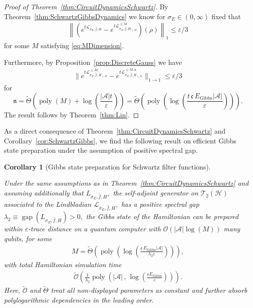 \documentclass[11pt]{amsart}
\newcommand{\1}{\mathbbm{1}}
\newcommand{\cH}{\mathcal{H}}
\newcommand{\cL}{\mathcal{L}}
\newcommand{\eps}{\varepsilon}
\renewcommand{\epsilon}{\varepsilon}
\newcommand{\cA}{\mathcal{A}}
\theoremstyle{plain}
\newtheorem{corollary}[theorem]{Corollary}
\theoremstyle{definition}
\theoremstyle{remark}
\numberwithin{equation}{section}
\begin{document}
\begin{proof}[Proof of Theorem~\ref{thm:CircuitDynamicsSchwartz}]
By Theorem~\ref{thm:SchwartzGibbsDynamics} we know for $\sigma_E\in(0,\infty)$ fixed that
\begin{align*}
\left\|\left(e^{t\mathcal{L}_{\sigma_E,\widehat{f},H}}-e^{t\mathcal{L}^{\le M}_{\sigma_E,\widehat{f},H_{\le M}}}\right)(\rho)\right\|_1  \le \eps/3 
\end{align*}
for some $M$ satisfying \eqref{eq:MDimension}. 

Furthermore, by Proposition~\ref{prop:DiscreteGauss} we have 
\begin{align*}
\Big\|e^{t\mathcal{L}^{\le M}_{\sigma_E,\widehat{f},H_{\le M}}}-e^{t\mathcal{L}^{\le M,\mathfrak{n}}_{\sigma_E,\widehat{f},H_{\le M}}}\Big\|_{1\to 1}\le \epsilon/3
\end{align*}
for  $$\mathfrak{n} = \widetilde\Theta\left(\operatorname{poly}(M)+ \log\left(\frac{|\cA|t}{\eps}\right) \right) =\widetilde \Theta\left( \operatorname{poly}\left(\log\left(\frac{t\,\mathfrak{c}\,E_{\operatorname{Gibbs}}|\cA|}{\eps}\right)\right)\right).$$ The result follows by Theorem~\ref{thm:Lin}.

\end{proof}
As a direct consequence of Theorem~\ref{thm:CircuitDynamicsSchwartz} and Corollary~\ref{cor:SchwartzGibbs}, we find the following result on efficient Gibbs state preparation under the assumption of positive spectral gap.
\begin{corollary} [Gibbs state preparation for Schwartz filter functions]
\label{cor:GibbsCircuitSchwartz}

Under the same assumptions as in Theorem~\ref{thm:CircuitDynamicsSchwartz} and assuming additionally that  $L_{\sigma_E,\widehat{f},H},$ the self-adjoint generator on $\mathscr{T}_2(\cH)$ associated to the Lindbladian $\cL_{\sigma_E,\widehat f,H},$ has a positive spectral gap 
$\lambda_2 \equiv \operatorname{gap}\left(L_{\sigma_E,\widehat f,H}\right) >0,$ 
the Gibbs state of the Hamiltonian can be prepared within $\eps$-trace distance on a quantum computer with $\mathcal{O}(|\cA|\log(M))$ many qubits, for some 
\begin{align*}    
M =\widetilde\Theta\left(\operatorname{poly}\left(\log\left(\frac{\mathfrak{c}\,E_{\operatorname{Gibbs}}|\cA|}{\lambda_2 \eps}\right)\right)\right), 
\end{align*}
with total Hamiltonian simulation time 
\begin{align*}
\widetilde{\mathcal{O}}\left(\frac{1}{\lambda_2}\operatorname{poly}\left(|\mathcal{A}|\,,\,\log\left(\frac{\mathfrak{c}E_{\operatorname{Gibbs}}}{\epsilon}\right)\right)\right).
    \end{align*} 
Here, $\widetilde{\mathcal{O}}$ and $\widetilde\Theta$ treat all non-displayed parameters as constant
and further absorb  polylogarithmic dependencies in the leading order.
\end{corollary}
\end{document}
